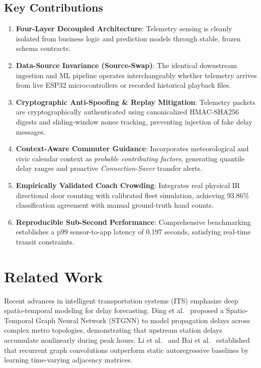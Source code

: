 \documentclass[conference]{IEEEtran}
\begin{document}
\subsection{Key Contributions}
\begin{enumerate}
    \item \textbf{Four-Layer Decoupled Architecture}: Telemetry sensing is cleanly isolated from business logic and prediction models through stable, frozen schema contracts.
    \item \textbf{Data-Source Invariance (Source-Swap)}: The identical downstream ingestion and ML pipeline operates interchangeably whether telemetry arrives from live ESP32 microcontrollers or recorded historical playback files.
    \item \textbf{Cryptographic Anti-Spoofing \& Replay Mitigation}: Telemetry packets are cryptographically authenticated using canonicalized HMAC-SHA256 digests and sliding-window nonce tracking, preventing injection of fake delay messages.
    \item \textbf{Context-Aware Commuter Guidance}: Incorporates meteorological and civic calendar context as \textit{probable contributing factors}, generating quantile delay ranges and proactive \textit{Connection-Saver} transfer alerts.
    \item \textbf{Empirically Validated Coach Crowding}: Integrates real physical IR directional door counting with calibrated fleet simulation, achieving 93.86\% classification agreement with manual ground-truth hand counts.
    \item \textbf{Reproducible Sub-Second Performance}: Comprehensive benchmarking establishes a p99 sensor-to-app latency of 0.197 seconds, satisfying real-time transit constraints.
\end{enumerate}

\section{Related Work}
Recent advances in intelligent transportation systems (ITS) emphasize deep spatio-temporal modeling for delay forecasting. Ding et al.~\cite{ding2021predicting} proposed a Spatio-Temporal Graph Neural Network (STGNN) to model propagation delays across complex metro topologies, demonstrating that upstream station delays accumulate nonlinearly during peak hours. Li et al.~\cite{li2018diffusion} and Bai et al.~\cite{bai2020adaptive} established that recurrent graph convolutions outperform static autoregressive baselines by learning time-varying adjacency matrices.
\end{document}
